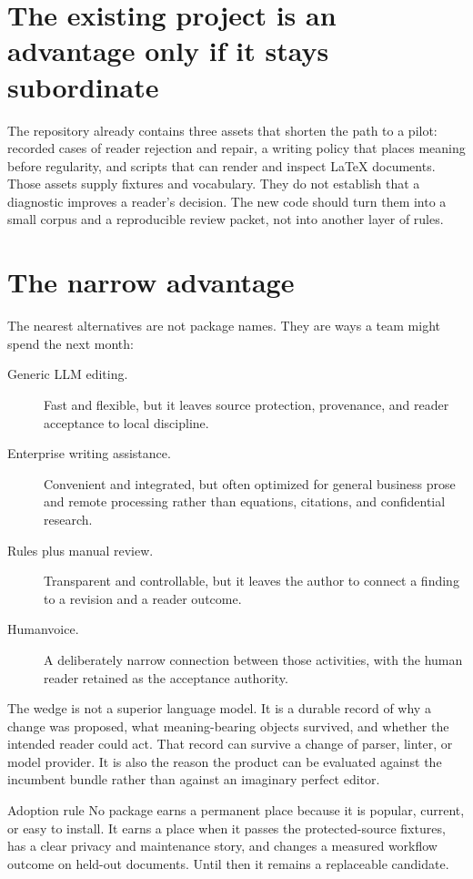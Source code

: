 \section{The existing project is an advantage only if it stays subordinate}

The repository already contains three assets that shorten the path to a pilot:
recorded cases of reader rejection and repair, a writing policy that places
meaning before regularity, and scripts that can render and inspect LaTeX
documents. Those assets supply fixtures and vocabulary. They do not establish
that a diagnostic improves a reader's decision. The new code should turn them
into a small corpus and a reproducible review packet, not into another layer of
rules.

\section{The narrow advantage}

The nearest alternatives are not package names. They are ways a team might
spend the next month:

\begin{description}
\item[Generic LLM editing.] Fast and flexible, but it leaves source protection,
  provenance, and reader acceptance to local discipline.
\item[Enterprise writing assistance.] Convenient and integrated, but often
  optimized for general business prose and remote processing rather than
  equations, citations, and confidential research.
\item[Rules plus manual review.] Transparent and controllable, but it leaves
  the author to connect a finding to a revision and a reader outcome.
\item[Humanvoice.] A deliberately narrow connection between those activities,
  with the human reader retained as the acceptance authority.
\end{description}

The wedge is not a superior language model. It is a durable record of why a
change was proposed, what meaning-bearing objects survived, and whether the
intended reader could act. That record can survive a change of parser, linter,
or model provider. It is also the reason the product can be evaluated against
the incumbent bundle rather than against an imaginary perfect editor.

\begin{boundarybox}{Adoption rule}
No package earns a permanent place because it is popular, current, or easy to
install. It earns a place when it passes the protected-source fixtures, has a
clear privacy and maintenance story, and changes a measured workflow outcome
on held-out documents. Until then it remains a replaceable candidate.
\end{boundarybox}
